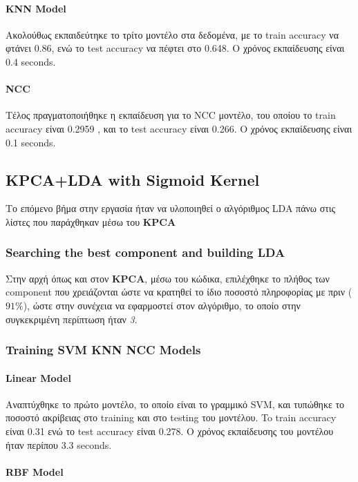 \paragraph{KNN Model}
Ακολούθως εκπαιδεύτηκε το τρίτο μοντέλο στα δεδομένα, με το train accuracy να φτάνει 0.86, ενώ το test accuracy να πέφτει στο 0.648. Ο χρόνος εκπαίδευσης είναι 0.4 seconds.
\paragraph{NCC}
Τέλος πραγματοποιήθηκε η εκπαίδευση για το NCC μοντέλο, του οποίου το train accuracy είναι 0.2959 , και το test accuracy είναι 0.266. Ο χρόνος εκπαίδευσης είναι 0.1 seconds.
\subsection{KPCA+LDA with Sigmoid Kernel}

Το επόμενο βήμα στην εργασία ήταν να υλοποιηθεί ο αλγόριθμος LDA πάνω στις λίστες που παράχθηκαν μέσω του \textbf{KPCA}
\subsubsection{Searching the best component  and building LDA  }

Στην αρχή όπως και στον \textbf{KPCA}, μέσω του κώδικα, επιλέχθηκε το πλήθος των component που χρειάζονται ώστε να κρατηθεί το ίδιο ποσοστό πληροφορίας με πριν ($91\%$), ώστε στην συνέχεια να εφαρμοστεί στον αλγόριθμο, το οποίο στην συγκεκριμένη περίπτωση ήταν \emph{3}.

\subsubsection{Training SVM KNN NCC Models}

\paragraph{Linear Model}

Αναπτύχθηκε το πρώτο μοντέλο, το οποίο είναι το γραμμικό SVM, και
τυπώθηκε το ποσοστό ακρίβειας στο training και στο testing του μοντέλου. To train accuracy είναι 0.31 ενώ το test accuracy είναι 0.278. Ο χρόνος εκπαίδευσης του μοντέλου ήταν περίπου 3.3 seconds.

\paragraph{RBF Model}

